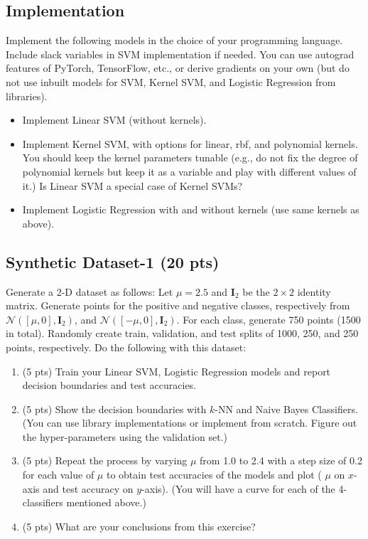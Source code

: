 \documentclass[a4paper]{article}
\theoremstyle{definition}
\begin{document}
\subsection{Implementation}
Implement the following models in the choice of your programming language. Include slack variables in SVM implementation if needed. You can use autograd features of PyTorch, TensorFlow, etc., or derive gradients on your own (but do not use inbuilt models for SVM, Kernel SVM, and Logistic Regression from libraries).
\begin{itemize}
    \item Implement Linear SVM (without kernels).
    \item Implement Kernel SVM, with options for linear, rbf, and polynomial kernels. You should keep the kernel parameters tunable (e.g., do not fix the degree of polynomial kernels but keep it as a variable and play with different values of it.) Is Linear SVM a special case of Kernel SVMs?
\item Implement Logistic Regression with and without kernels (use same kernels as above).
\end{itemize}
\subsection{ Synthetic Dataset-1 (20 pts)}
Generate a 2-D dataset as follows:
Let $\mu = 2.5$ and $\mathbf I_2$ be the $2 \times 2$ identity matrix. Generate points for the positive and negative classes, respectively
from $\mathcal{N} ([\mu, 0], \mathbf I_2)$, and $\mathcal{N} ([-\mu, 0], \mathbf I_2)$. For each class, generate 750 points (1500 in total). Randomly create train, validation, and test splits of 1000, 250, and 250 points, respectively. Do the following with this dataset:
\begin{enumerate}
    \item  (5 pts) Train your Linear SVM, Logistic Regression models and report decision boundaries and test accuracies.

\item (5 pts) Show the decision boundaries with $k$-NN and Naive Bayes Classifiers. (You can use library implementations or implement from scratch. Figure out the hyper-parameters using the validation set.)

\item (5 pts) Repeat the process by varying $\mu$ from 1.0 to 2.4 with a step size of 0.2 for each value of $\mu$ to obtain test
accuracies of the models and plot ( $\mu$ on $x$-axis and test accuracy on $y$-axis). (You will have a curve for
each of the 4-classifiers mentioned above.)
\item (5 pts) What are your conclusions from this exercise?
\end{enumerate}
\end{document}
